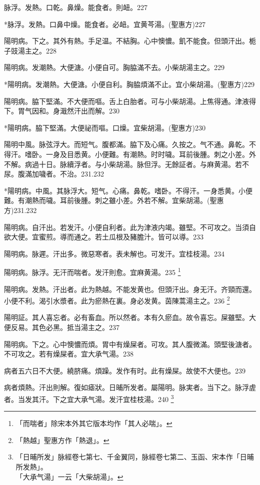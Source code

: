 \documentclass[b5paper,twoside,zihao=-4,UTF8]{ctexbook}
\begin{document}
脉浮。发熱。口乾。鼻燥。能食者。則衄。227

*脉浮。发熱。口鼻中燥。能食者。必衄。宜黄芩湯。(聖惠方)227

陽明病。下之。其外有熱。手足温。不結胸。心中懊憹。飢不能食。但頭汗出。栀子{豉}湯主之。228

陽明病。发潮熱。大便溏。小便自可。胸脇滿不去。小柴胡湯主之。229

*陽明病。发潮熱。大便溏。小便自利。胸脇煩滿不止。宜小柴胡湯。(聖惠方)229

陽明病。脇下堅滿。不大便而嘔。舌上白胎者。可与小柴胡湯。上焦得通。津液得下。胃气因和。身濈然汗出而解。230

*陽明病。脇下堅滿。大便祕而嘔。口燥。宜柴胡湯。(聖惠方)230

陽明中風。脉弦浮大。而短气。腹都滿。脇下及心痛。久按之。气不通。鼻乾。不得汗。嗜卧。一身及目悉黄。小便難。有潮熱。时时噦。耳前後腫。刺之小差。外不解。病過十日。脉續浮者。与{小}柴胡湯。脉但浮。无餘証者。与麻黄湯。若不尿。腹滿加噦者。不治。231.232

*陽明病。中風。其脉浮大。短气。心痛。鼻乾。嗜卧。不得汗。一身悉黄。小便難。有潮熱而噦。耳前後腫。刺之雖小差。外若不解。宜柴胡湯。(聖惠方)231.232

陽明病。自汗出。若发汗。小便自利者。此为{津液}内竭。雖堅。不可攻之。当須自欲大便。宜蜜煎。導而通之。若土瓜根及豬膽汁。皆可以導。233

陽明病。脉遲。汗出多。微惡寒者。表未解也。可发汗。宜桂枝湯。234

陽明病。脉浮。无汗而喘者。发汗則愈。宜麻黄湯。235
	\footnote{「而喘者」除宋本外其它版本均作「其人必喘」。}

陽明病。发熱。汗出者。此为熱越。不能发黄也。但頭汗出。身无汗。齐頸而還。小便不利。渴引水漿者。此为瘀熱在裏。身必发黄。茵陳{蒿}湯主之。236
	\footnote{「熱越」聖惠方作「熱退」。}

陽明証。其人喜忘者。必有畜血。所以然者。本有久瘀血。故令喜忘。屎雖堅。大便反易。其色必黑。抵当湯主之。237

陽明病。下之。心中懊憹而煩。胃中有燥屎者。可攻。其人腹微滿。頭堅後溏者。不可攻之。若有燥屎者。宜{大}承气湯。238

病者五六日不大便。繞脐痛。煩躁。发作有时。此有燥屎。故使不大便也。239

病者煩熱。汗出則解。復如瘧狀。日晡所发者。屬陽明。脉実者。当下之。脉浮虗者。当发其汗。下之宜{大}承气湯。发汗宜桂枝湯。240
	\footnote{「日晡所发」脉經卷七第七、千金翼同，脉經卷七第二、玉函、宋本作「日晡所发熱」。\\「大承气湯」一云「大柴胡湯」。}
\end{document}
